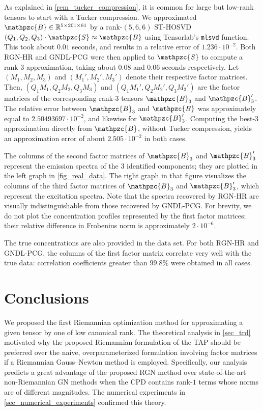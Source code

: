 \documentclass[a4paper,10pt,final]{siamart1116}
\newcommand{\tensor}[1]{\mathpzc{#1}}
\newcommand{\R}{\mathbb{R}}
\newcommand{\refsec}[1]{{\cref{#1}}}
\newcommand{\reffig}[1]{{\cref{#1}}}
\newcommand{\refrem}[1]{{\cref{#1}}}
\numberwithin{equation}{section}
\numberwithin{figure}{section}
\numberwithin{table}{section}
\numberwithin{theorem}{section}
\begin{document}
As explained in \refrem{rem_tucker_compression}, it is common for large but low-rank tensors to start with a Tucker compression. We approximated $\tensor{B} \in \R^{5 \times 201 \times 61}$ by a rank-$(5,6,6)$ ST-HOSVD \cite{VVM2012} $(Q_1, Q_2, Q_3) \cdot \tensor{S} \approx \tensor{B}$ using Tensorlab's \texttt{mlsvd} function. This took about $0.01$ seconds, and results in a relative error of $1.236 \cdot 10^{-2}$. Both RGN-HR and GNDL-PCG were then applied to $\tensor{S}$ to compute a rank-$3$ approximation, taking about $0.08$ and $0.06$ seconds respectively. Let $(M_1,M_2,M_3)$ and $(M_1', M_2', M_3')$ denote their respective factor matrices. Then, $(Q_1 M_1, Q_2 M_2, Q_3 M_3)$ and $(Q_1 M_1', Q_2 M_2', Q_3 M_3')$ are the factor matrices of the corresponding rank-$3$ tensors $\tensor{B}_3$ and $\tensor{B}_3'$. The relative error between $\tensor{B}_3$ and $\tensor{B}$ was approximately equal to $2.50493697 \cdot 10^{-2}$, and likewise for $\tensor{B}_3'$. Computing the best-$3$ approximation directly from $\tensor{B}$, without Tucker compression, yields an approximation error of about $2.505 \cdot 10^{-2}$ in both cases.

The columns of the second factor matrices of $\tensor{B}_3$ and $\tensor{B}_3'$ represent the emission spectra of the $3$ identified components; they are plotted in the left graph in \reffig{fig_real_data}. The right graph in that figure visualizes the columns of the third factor matrices of $\tensor{B}_3$ and $\tensor{B}_3'$, which represent the excitation spectra. Note that the spectra recovered by RGN-HR are visually indistinguishable from those recovered by GNDL-PCG. For brevity, we do not plot the concentration profiles represented by the first factor matrices; their relative difference in Frobenius norm is approximately $2 \cdot 10^{-6}$.

The true concentrations are also provided in the data set. For both RGN-HR and GNDL-PCG, the columns of the first factor matrix correlate very well with the true data: correlation coefficients greater than $99.8\%$ were obtained in all cases.


\section{Conclusions} \label{sec_conclusions}
We proposed the first Riemannian optimization method for approximating a given tensor by one of low canonical rank. The theoretical analysis in \refsec{sec_trd} motivated why the proposed Riemannian formulation of the TAP should be preferred over the naive, overparameterized formulation involving factor matrices if a Riemannian Gauss--Newton method is employed. Specifically, our analysis predicts a great advantage of the proposed RGN method over state-of-the-art non-Riemannian GN methods when the CPD contains rank-$1$ terms whose norms are of different magnitudes. The numerical experiments in \refsec{sec_numerical_experiments} confirmed this theory.
\end{document}
